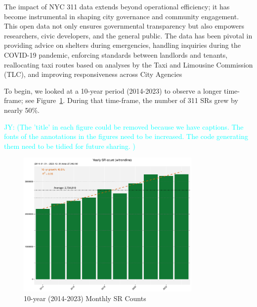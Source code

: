\documentclass[linenumber]{jdsart}
\newcommand{\jy}[1]{\textcolor{cyan}{JY: (#1)}}
\begin{document}

The impact of NYC 311 data extends beyond operational efficiency; it
has become instrumental in shaping city governance and community
engagement. This open data not only ensures governmental transparency
but also empowers researchers, civic developers, and the general
public. The data has been pivotal in providing advice on shelters
during emergencies, handling inquiries during the COVID-19 pandemic,
enforcing standards between landlords and tenants, reallocating taxi
routes based on analyses by the Taxi and Limousine Commission (TLC),
and improving responsiveness across City Agencies

To begin, we looked at a 10-year period (2014-2023) to
observe a longer time-frame; see
Figure~\ref{fig:10-yr-monthly}. During that time-frame,
the number of 311 SRs grew by nearly 50\%.


\jy{The 'title' in each figure could be removed because we have
  captions. The fonts of the annotations in the figures need to be
  increased. The code generating them need to be tidied for future
  sharing.
}



\begin{figure}[tbp]
	\centering
  	\includegraphics[width=0.8\textwidth]{10-year-trend_yearly.pdf}
 	\caption{10-year (2014-2023) Monthly SR Counts}
  	\label{fig:10-yr-monthly}
\end{figure}
\end{document}
